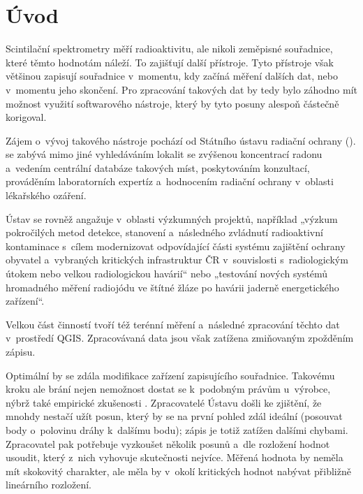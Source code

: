 \chapter{Úvod}
\label{1-uvod}

Scintilační spektrometry měří radioaktivitu, ale nikoli zeměpisné souřadnice, které těmto hodnotám
náleží. To zajišťují další přístroje. Tyto přístroje však většinou zapisují souřadnice
v~momentu, kdy začíná měření dalších dat, nebo v~momentu jeho skončení. Pro zpracování takových dat
by tedy bylo záhodno mít možnost využití softwarového nástroje, který by tyto posuny alespoň
částečně korigoval. 

Zájem o~vývoj takového nástroje pochází od Státního ústavu radiační ochrany ().
 se zabývá mimo jiné vyhledáváním lokalit se zvýšenou koncentrací radonu a~vedením centrální
databáze takových míst, poskytováním konzultací, prováděním laboratorních expertíz a~hodnocením
radiační ochrany v~oblasti lékařského ozáření. 

Ústav se rovněž angažuje v~oblasti výzkumných projektů, například „výzkum pokročilých metod detekce,
stanovení a~následného zvládnutí radioaktivní kontami\-nace s~cílem modernizovat odpovídající části
systému zajištění ochrany obyvatel a~vybraných kritických infrastruktur ČR v~souvislosti
s~radiologickým útokem nebo velkou radiologickou havárií“ nebo „testování nových systémů
hromadného měření radiojódu ve štítné žláze po havárii jaderně energetického zařízení“. \cite{surovyzkum}

Velkou část činností  tvoří též terénní měření a~následné zpracování
těchto dat v~prostředí QGIS. Zpracovávaná data jsou však zatížena zmiňovaným zpožděním zápisu. 

Optimální by se zdála modifikace zařízení zapisujícího souřadnice. Takovému kroku
ale brání nejen nemožnost dostat se k~podobným právům u~výrobce, nýbrž také empirické zkušenosti
. Zpracovatelé Ústavu došli ke zjištění, že mnohdy nestačí užít posun, který by se na první
pohled zdál ideální (posouvat body o~polo\-vinu dráhy k~dalšímu bodu); zápis je totiž zatížen dalšími
chybami. Zpracovatel pak potřebuje vyzkoušet několik posunů a~dle rozložení hodnot usoudit, který
z~nich vyhovuje skutečnosti nejvíce. Měřená hodnota by neměla mít skokovitý charakter, ale měla by
v~okolí kritických hodnot nabývat přibližně lineárního rozložení. 

